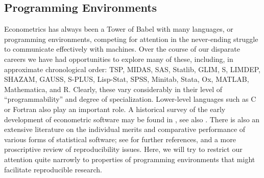 \documentclass[10pt,a4paper,twoside]{article}
\let\proglang=\textsf
\begin{document}
\subsection{Programming Environments} \label{sec:programming}


Econometrics has always been a Tower of Babel with many languages, or programming
environments,  
competing for attention in the never-ending struggle to communicate effectively
with machines. Over the course of our disparate careers we have had
opportunities to explore many of these, including, in approximate chronological order:  
\proglang{TSP}, \proglang{MIDAS}, \proglang{SAS}, \proglang{Statlib},
\proglang{GLIM}, \proglang{S}, \proglang{LIMDEP}, \proglang{SHAZAM}, \proglang{GAUSS},
\proglang{S-PLUS}, \proglang{Lisp-Stat}, \proglang{SPSS}, \proglang{Minitab},
\proglang{Stata}, \proglang{Ox}, \proglang{MATLAB}, \proglang{Mathematica}, and 
\proglang{R}. Clearly, these vary considerably in their level of ``programmability'' and
degree of specialization. Lower-level languages such as \proglang{C} or \proglang{Fortran}
also play an important role. A historical survey of the early development of econometric software
may be found in \cite{repro:Renfro:2004}, see also \cite{repro:Ooms+Doornik:2006}. 
There is also an extensive literature on the individual merits and comparative 
performance of various forms of statistical software;  see \cite{repro:Baiocchi:2007} 
for further references, and a more proscriptive review of reproducibility issues.
Here, we will try to restrict our attention quite narrowly to properties of
programming environments that might facilitate reproducible research.
\end{document}
